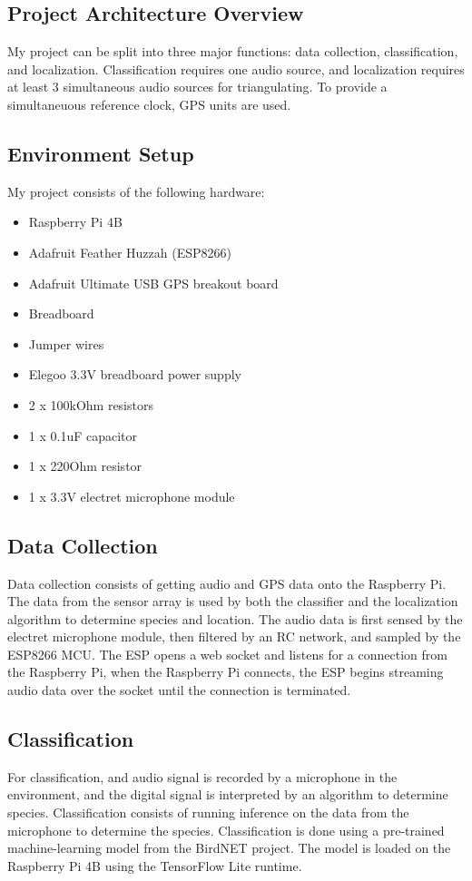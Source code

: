 \documentclass[12pt]{article}
\begin{document}
\subsection{Project Architecture Overview}
	My project can be split into three major functions: data collection, classification, and localization. Classification requires one audio source, and localization requires at least 3 simultaneous audio sources for triangulating. To provide a simultaneuous reference clock, GPS units are used. 

\subsection{Environment Setup}

	My project consists of the following hardware:
\begin{itemize}
\item Raspberry Pi 4B
\item Adafruit Feather Huzzah (ESP8266)
\item Adafruit Ultimate USB GPS breakout board
\item Breadboard
\item Jumper wires
\item Elegoo 3.3V breadboard power supply
\item2 x 100kOhm resistors
\item1 x 0.1uF capacitor
\item1 x 220Ohm resistor
\item1 x 3.3V electret microphone module
\end{itemize}
	

\subsection{Data Collection}
Data collection consists of getting audio and GPS data onto the Raspberry Pi. The data from the sensor array is used by both the classifier and the localization algorithm to determine species and location. The audio data is first sensed by the electret microphone module, then filtered by an RC network, and sampled by the ESP8266 MCU. The ESP opens a web socket and listens for a connection from the Raspberry Pi, when the Raspberry Pi connects, the ESP begins streaming audio data over the socket until the connection is terminated.

\subsection{Classification}
For classification, and audio signal is recorded by a microphone in the environment, and the digital signal is interpreted by an algorithm to determine species. Classification consists of running inference on the data from the microphone to determine the species. Classification is done using a pre-trained machine-learning model from the BirdNET project. The model is loaded on the Raspberry Pi 4B using the TensorFlow Lite runtime. 
\end{document}
